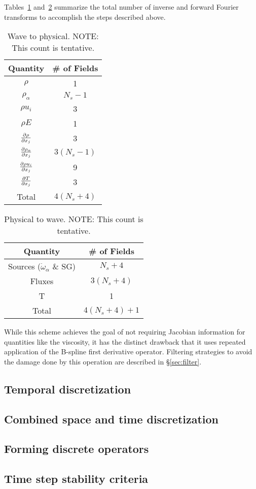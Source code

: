 Tables~\ref{tbl:w2p} and~\ref{tbl:p2w} summarize the total number of
inverse and forward Fourier transforms to accomplish the steps
described above.
%
\begin{table}[ht]
\caption{Wave to physical.  NOTE: This count is tentative.}
\begin{tabular}{|c|c|}
\hline
Quantity & \# of Fields \\
\hline
\hline
$\rho$ & 1 \\
$\rho_{\alpha}$ & $N_s - 1$ \\
$\rho u_i$ & 3 \\
$\rho E$ & 1 \\
$\frac{\partial \rho}{\partial x_j}$ & 3 \\
$\frac{\partial \rho_{\alpha}}{\partial x_j}$ & $3 (N_s - 1)$ \\
$\frac{\partial \rho u_i}{\partial x_j}$ & 9 \\
$\frac{\partial T}{\partial x_j}$ & 3 \\
\hline
Total & $4(N_s + 4)$\\
\hline
\end{tabular}
\label{tbl:w2p}
\end{table}
% 
%
\begin{table}[ht]
\caption{Physical to wave.  NOTE: This count is tentative.}
\begin{tabular}{|c|c|}
\hline
Quantity & \# of Fields \\
\hline
\hline
Sources ($\dot{\omega}_{\alpha}$ \& SG) & $N_s + 4$ \\
Fluxes & $3 (N_s +4)$ \\
T & 1 \\
\hline
Total & $4(N_s + 4) + 1$\\
\hline
\end{tabular}
\label{tbl:p2w}
\end{table}
% 

While this scheme achieves the goal of not requiring Jacobian
information for quantities like the viscosity, it has the distinct
drawback that it uses repeated application of the B-spline first
derivative operator.  Filtering strategies to avoid the damage done by
this operation are described in \S\ref{sec:filter}.


\subsection{Temporal discretization}
\label{sec:temporal_discretization}

\subsection{Combined space and time discretization}
\label{sec:combineddiscretization}

\subsection{Forming discrete operators}
\label{sec:formingoperators}

\subsection{Time step stability criteria}
\label{sec:stabilitycriteria}
